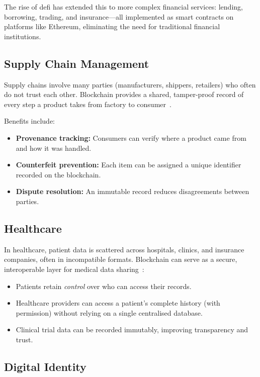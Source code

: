 The rise of \gls{defi} has extended this to more complex financial services: lending, borrowing, trading, and insurance---all implemented as smart contracts on platforms like Ethereum, eliminating the need for traditional financial institutions.

\subsection{Supply Chain Management}

Supply chains involve many parties (manufacturers, shippers, retailers) who often do not trust each other. Blockchain provides a shared, tamper-proof record of every step a product takes from factory to consumer~\cite{abeyratne2016supplychain}. 

Benefits include:
\begin{itemize}
    \item \textbf{Provenance tracking:} Consumers can verify where a product came from and how it was handled.
    \item \textbf{Counterfeit prevention:} Each item can be assigned a unique identifier recorded on the blockchain.
    \item \textbf{Dispute resolution:} An immutable record reduces disagreements between parties.
\end{itemize}

\subsection{Healthcare}

In healthcare, patient data is scattered across hospitals, clinics, and insurance companies, often in incompatible formats. Blockchain can serve as a secure, interoperable layer for medical data sharing~\cite{azaria2016medrec}:
\begin{itemize}
    \item Patients retain \emph{control} over who can access their records.
    \item Healthcare providers can access a patient's complete history (with permission) without relying on a single centralised database.
    \item Clinical trial data can be recorded immutably, improving transparency and trust.
\end{itemize}

\subsection{Digital Identity}

